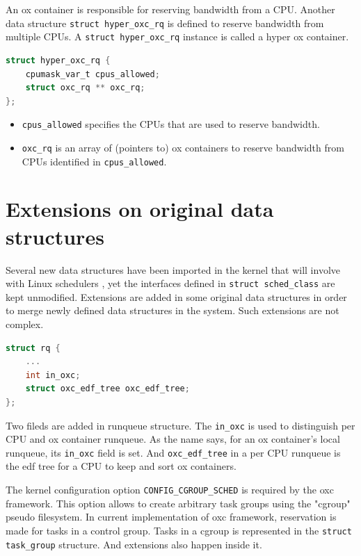 An ox container is responsible for reserving bandwidth from a CPU.
Another data structure \texttt{struct hyper\_oxc\_rq} is defined to 
reserve bandwidth from multiple CPUs. A \texttt{struct hyper\_oxc\_rq}
instance is called a hyper ox container. 

\begin{lstlisting}[language=C, caption={The hyper ox container}]
struct hyper_oxc_rq {
	cpumask_var_t cpus_allowed;
	struct oxc_rq ** oxc_rq;
};
\end{lstlisting}
\begin{itemize}
\item \texttt{cpus\_allowed} specifies the CPUs that are used to reserve 
				bandwidth.
\item \texttt{oxc\_rq} is an array of (pointers to) ox containers to 
		reserve bandwidth from CPUs identified in 
		\texttt{cpus\_allowed}.
\end{itemize}

\section{Extensions on original data structures\label{sec:extention}}
Several new data structures have been imported in the kernel that will
involve with Linux schedulers , yet the interfaces defined in 
\texttt{struct sched\_class} are kept unmodified. Extensions are added 
in some original data structures in order to merge newly defined data 
structures in the system. Such extensions are not complex.

\begin{lstlisting}[language=C, caption={Extensions on \texttt{struct rq}}]
struct rq {
	...
	int in_oxc;
	struct oxc_edf_tree oxc_edf_tree;
};
\end{lstlisting}
Two fileds are added in runqueue structure. The \texttt{in\_oxc} is 
used to distinguish per CPU and ox container runqueue.
As the name says, for an ox container's local runqueue, its 
\texttt{in\_oxc} field is set. And \texttt{oxc\_edf\_tree} in a 
per CPU runqueue is the edf tree for a CPU to keep and sort ox
containers.

The kernel configuration option \texttt{CONFIG\_CGROUP\_SCHED} is required
by the oxc framework. This option allows to create arbitrary task groups
using the "cgroup" pseudo filesystem. In current implementation of oxc 
framework, reservation is made for tasks in a control group. Tasks in a 
cgroup is represented in the \texttt{struct task\_group} structure. And 
extensions also happen inside it.

